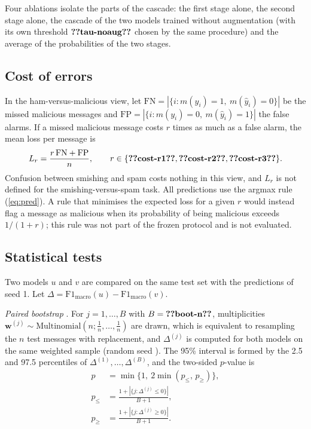 Four ablations isolate the parts of the cascade: the first stage alone, the second stage alone, the cascade of the two models trained without augmentation (with its own threshold $\val{tau-noaug}$ chosen by the same procedure) and the average of the probabilities of the two stages.

\subsection{Cost of errors}\label{sec:cost}

In the ham-versus-malicious view, let $\mathrm{FN}=|\{i:m(y_i)=1,\ m(\hat{y}_i)=0\}|$ be the missed malicious messages and $\mathrm{FP}=|\{i:m(y_i)=0,\ m(\hat{y}_i)=1\}|$ the false alarms. If a missed malicious message costs $r$ times as much as a false alarm, the mean loss per message is
\begin{equation}\label{eq:cost}
L_r=\frac{r\,\mathrm{FN}+\mathrm{FP}}{n},\qquad r\in\{\val{cost-r1},\val{cost-r2},\val{cost-r3}\}.
\end{equation}
Confusion between smishing and spam costs nothing in this view, and $L_r$ is not defined for the smishing-versus-spam task. All predictions use the argmax rule (\ref{eq:pred}). A rule that minimises the expected loss for a given $r$ would instead flag a message as malicious when its probability of being malicious exceeds $1/(1+r)$; this rule was not part of the frozen protocol and is not evaluated.

\subsection{Statistical tests}\label{sec:stats}

Two models $u$ and $v$ are compared on the same test set with the predictions of seed 1. Let $\Delta=\mathrm{F1}_{\mathrm{macro}}(u)-\mathrm{F1}_{\mathrm{macro}}(v)$.

\emph{Paired bootstrap} \cite{efron1993}. For $j=1,\dots,B$ with $B=\val{boot-n}$, multiplicities $\mathbf{w}^{(j)}\sim\mathrm{Multinomial}(n;\tfrac{1}{n},\dots,\tfrac{1}{n})$ are drawn, which is equivalent to resampling the $n$ test messages with replacement, and $\Delta^{(j)}$ is computed for both models on the same weighted sample (random seed ). The 95\% interval is formed by the 2.5 and 97.5 percentiles of $\Delta^{(1)},\dots,\Delta^{(B)}$, and the two-sided $p$-value is
\begin{equation}\label{eq:bootp}
\begin{aligned}
p&=\min\bigl\{1,\ 2\min(p_{\le},\,p_{\ge})\bigr\},\\
p_{\le}&=\frac{1+|\{j:\Delta^{(j)}\le 0\}|}{B+1},\\
p_{\ge}&=\frac{1+|\{j:\Delta^{(j)}\ge 0\}|}{B+1}.
\end{aligned}
\end{equation}

